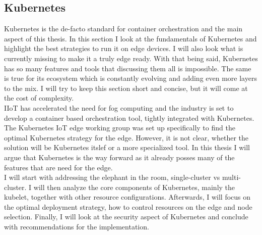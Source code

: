 \subsection{Kubernetes}
Kubernetes is the de-facto standard for container orchestration and the main aspect of this thesis. In this section I look at the fundamentals of Kubernetes and highlight the best strategies to run it on edge devices. I will also look what is currently missing to make it a truly edge ready. With that being said, Kubernetes has so many features and tools that discussing them all is impossible. The same is true for its ecosystem which is constantly evolving and adding even more layers to the mix. I will try to keep this section short and concise, but it will come at the cost of complexity.\\
IIoT has accelerated the need for fog computing and the industry is set to develop a container based orchestration tool, tightly integrated with Kubernetes. The Kubernetes IoT edge working group was set up specifically to find the optimal Kubernetes strategy for the edge. However, it is not clear, whether the solution will be Kubernetes itslef or a more specialized tool. In this thesis I will argue that Kubernetes is the way forward as it already posses many of the features that are need for the edge.\\ 
I will start with addressing the elephant in the room, single-cluster vs multi-cluster. I will then analyze the core components of Kubernetes, mainly the kubelet, together with other resource configurations. Afterwards, I will focus on the optimal deployment strategy, how to control resources on the edge and node selection. Finally, I will look at the security aspect of Kubernetes and conclude with recommendations for the implementation.



